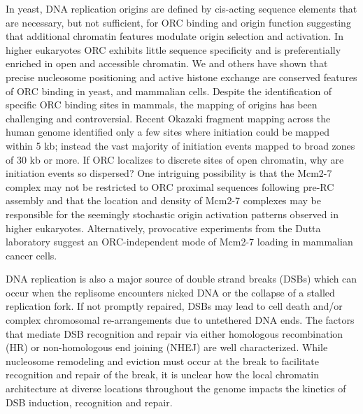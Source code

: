 In yeast, DNA replication origins are defined by cis-acting sequence elements that are necessary, but not sufficient, for ORC binding and origin function\citep{Breier2004-tw} suggesting that additional chromatin features modulate origin selection and activation.  In higher eukaryotes ORC exhibits little sequence specificity\citep{Vashee2003-xr} and is preferentially enriched in open and accessible chromatin\citep{MacAlpine2010-ju,Miotto2016-jt}.   We and others have shown that precise nucleosome positioning and active histone exchange are conserved features of ORC binding in yeast\citep{Eaton2010-fq,Berbenetz2010-hh}, \dros\citep{Liu2015-nr,MacAlpine2010-wz} and mammalian cells\citep{Lombrana2013-aw,Lubelsky2011-dj}.  Despite the identification of specific ORC binding sites in mammals\citep{Miotto2016-jt}, the mapping of origins has been challenging and controversial\citep{Prioleau2016-bj}.  Recent Okazaki fragment mapping across the human genome identified only a few sites where initiation could be mapped within 5 kb; instead the vast majority of initiation events mapped to broad zones of 30 kb or more\citep{Petryk2016-rr}.  If ORC localizes to discrete sites of open chromatin\citep{MacAlpine2010-ju,Miotto2016-jt}, why are initiation events so dispersed?  One intriguing possibility is that the Mcm2-7 complex may not be restricted to ORC proximal sequences following pre-RC assembly and that the location and density of Mcm2-7 complexes may be responsible for the seemingly stochastic origin activation patterns observed in higher eukaryotes. Alternatively, provocative experiments from the Dutta laboratory suggest an ORC-independent mode of Mcm2-7 loading in mammalian cancer cells\citep{Shibata2016-uc}. 

DNA replication is also a major source of double strand breaks (DSBs) which can occur when the replisome encounters nicked DNA or the collapse of a stalled replication fork\citep{Munoz2017-mi}. If not promptly repaired, DSBs may lead to cell death and/or complex chromosomal re-arrangements due to untethered DNA ends\cite{Morgan1998}. The factors that mediate DSB recognition and repair via either homologous recombination (HR) or non-homologous end joining (NHEJ) are well characterized\cite{Symington2011}. While nucleosome remodeling and eviction must occur at the break to facilitate recognition and repair of the break, %
it is unclear how the local chromatin architecture at diverse locations throughout the genome impacts the kinetics of DSB induction, recognition and repair.

